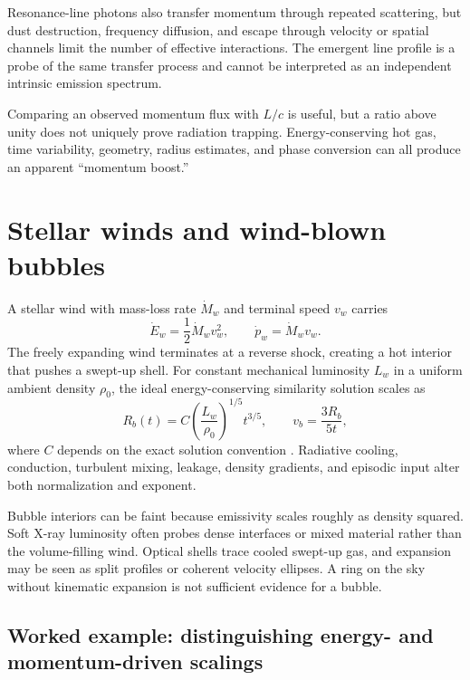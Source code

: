 Resonance-line photons also transfer momentum through repeated scattering, but dust
destruction, frequency diffusion, and escape through velocity or spatial channels
limit the number of effective interactions.  The emergent line profile is a probe of
the same transfer process and cannot be interpreted as an independent intrinsic
emission spectrum.

Comparing an observed momentum flux with $L/c$ is useful, but a ratio above unity does
not uniquely prove radiation trapping.  Energy-conserving hot gas, time variability,
geometry, radius estimates, and phase conversion can all produce an apparent
``momentum boost.''

\section{Stellar winds and wind-blown bubbles}

A stellar wind with mass-loss rate $\dot M_w$ and terminal speed $v_w$ carries
\begin{equation}
 \dot E_w=\frac12\dot M_wv_w^2,
 \qquad \dot p_w=\dot M_wv_w.
 \label{eq:stellar-wind-power}
\end{equation}
The freely expanding wind terminates at a reverse shock, creating a hot interior that
pushes a swept-up shell.  For constant mechanical luminosity $L_w$ in a uniform
ambient density $\rho_0$, the ideal energy-conserving similarity solution scales as
\begin{equation}
 R_b(t)=C\left(\frac{L_w}{\rho_0}\right)^{1/5}t^{3/5},
 \qquad v_b=\frac{3R_b}{5t},
 \label{eq:wind-bubble-scaling}
\end{equation}
where $C$ depends on the exact solution convention \citep{WeaverEtAl1977}.  Radiative
cooling, conduction, turbulent mixing, leakage, density gradients, and episodic input
alter both normalization and exponent.

Bubble interiors can be faint because emissivity scales roughly as density squared.
Soft X-ray luminosity often probes dense interfaces or mixed material rather than the
volume-filling wind.  Optical shells trace cooled swept-up gas, and expansion may be
seen as split profiles or coherent velocity ellipses.  A ring on the sky without
kinematic expansion is not sufficient evidence for a bubble.

\subsection{Worked example: distinguishing energy- and momentum-driven scalings}

